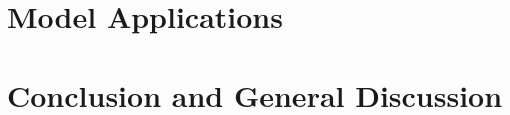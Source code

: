 \documentclass[online,faculty=firw,department=wtk,phddegree=wtk]{adsphd}
\begin{document}
\part{Model Applications}

\part{Conclusion and General Discussion}


\backmatter



\instructionsbibliography


\begin{appendices}


\end{appendices}



\makebackcoverXII
\end{document}
